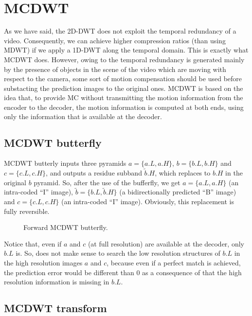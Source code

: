 \section{MCDWT}
As we have said, the 2D-DWT does not exploit the temporal redundancy
of a video. Consequently, we can achieve higher compression ratios
(than using MDWT) if we apply a 1D-DWT along the temporal domain.
This is exactly what MCDWT does. However, owing to the temporal
redundancy is generated mainly by the presence of objects in the scene
of the video which are moving with respect to the camera, some sort of
motion compensation should be used before substacting the prediction
images to the original ones. MCDWT is based on the idea that, to
provide MC without transmitting the motion information from the
encoder to the decoder, the motion information is computed at both
ends, using only the information that is available at the decoder.

\subsection{MCDWT butterfly}

MCDWT butterly inputs three pyramids $a=\{a.L, a.H\}$, $b=\{b.L,
b.H\}$ and $c=\{c.L, c.H\}$, and outputs a residue subband
$\tilde{b}.H$, which replaces to $b.H$ in the original $b$
pyramid. So, after the use of the bufferfly, we get $a=\{a.L, a.H\}$
(an intra-coded ``I'' image), $\tilde{b}=\{b.L, \tilde{b}.H\}$ (a
bidirectionally predicted ``B'' image) and $c=\{c.L, c.H\}$ (an
intra-coded ``I'' image). Obviously, this replacement is fully
reversible.

\begin{figure}
\centering
{}
\caption{Forward MCDWT butterfly.}
\end{figure}


Notice that, even if $a$ and $c$ (at full resolution) are available
at the decoder, only $b.L$ is. So, does not make sense to search the
low resolution structures of $b.L$ in the high resolution images $a$
and $c$, because even if a perfect match is achieved, the prediction
error would be different than $0$ as a consequence of that the high
resolution information is missing in $b.L$.

\subsection{MCDWT transform}

